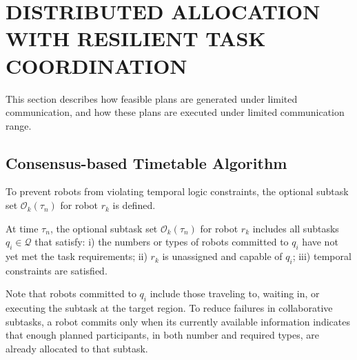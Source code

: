 \documentclass[lettersize,journal]{IEEEtran}
\begin{document}
\section{DISTRIBUTED ALLOCATION WITH RESILIENT TASK COORDINATION} \label{PLANNING}
This section describes how feasible plans are generated under limited communication,
and how these plans are executed under limited communication range.

\subsection{Consensus-based Timetable Algorithm} \label{CBTA}

To prevent robots from violating temporal logic constraints, the optional subtask set $\mathcal{O}_k(\tau_n)$ for robot $r_k$ is defined.
\begin{definition}
At time $\tau_n$, the optional subtask set $\mathcal{O}_k(\tau_n)$ for robot $r_k$ includes all subtasks $q_i \in \mathcal{Q}$ that satisfy:
i) the numbers or types of robots committed to $q_i$ have not yet met the task requirements; ii) $r_k$ is unassigned and capable of $q_i$; iii) temporal constraints are satisfied.
\end{definition}

Note that robots committed to $q_i$ include those traveling to, waiting in, or executing the subtask at the target region. To reduce failures in collaborative subtasks, a robot commits only when its currently available information indicates that enough planned participants, in both number and required types, are already allocated to that subtask.
\end{document}

